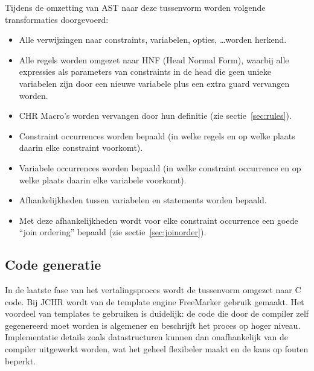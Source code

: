 Tijdens de omzetting van AST naar deze tussenvorm worden volgende transformaties doorgevoerd: \begin{itemize}
\item Alle verwijzingen naar constraints, variabelen, opties, \ldots worden herkend.
\item Alle regels worden omgezet naar HNF (Head Normal Form), waarbij alle expressies als parameters van constraints in de head die geen unieke variabelen zijn door een nieuwe variabele plus een extra guard vervangen worden.
\item CHR Macro's worden vervangen door hun definitie (zie sectie~\ref{sec:rules}).
\item Constraint occurrences worden bepaald (in welke regels en op welke plaats daarin elke constraint voorkomt).
\item Variabele occurrences worden bepaald (in welke constraint occurrence en op welke plaats daarin elke variabele voorkomt).
\item Afhankelijkheden tussen variabelen en statements worden bepaald.
\item Met deze afhankelijkheden wordt voor elke constraint occurrence een goede ``join ordering'' bepaald (zie sectie~\ref{sec:joinorder}).
\end{itemize}

\subsection{Code generatie} \label{sec:codegen}

In de laatste fase van het vertalingsproces wordt de tussenvorm omgezet naar C code. Bij JCHR wordt van de template engine FreeMarker gebruik gemaakt. Het voordeel van templates te gebruiken is duidelijk: de code die door de compiler zelf gegenereerd moet worden is algemener en beschrijft het proces op hoger niveau. Implementatie details zoals datastructuren kunnen dan onafhankelijk van de compiler uitgewerkt worden, wat het geheel flexibeler maakt en de kans op fouten beperkt.

